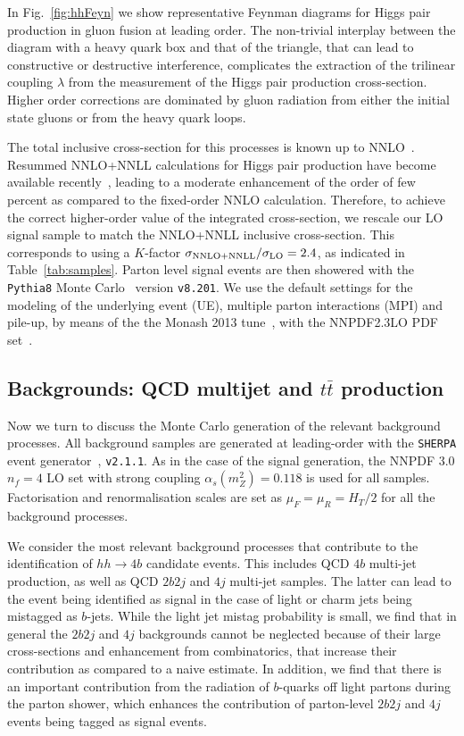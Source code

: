 In Fig.~\ref{fig:hhFeyn} we show representative Feynman diagrams
    for Higgs pair production in gluon fusion at
    leading order.
    The non-trivial interplay between the diagram with a heavy quark box
    and that of the triangle, that can lead to constructive or destructive interference,
    complicates the extraction of
    the trilinear coupling
    $\lambda$ from the measurement of the Higgs pair
    production cross-section.
    Higher order corrections are dominated by gluon radiation
    from either the initial state gluons or from the heavy quark loops.

    The total inclusive cross-section for this processes is
    known up to NNLO~\cite{deFlorian:2013jea}.
Resummed NNLO+NNLL calculations for Higgs pair production have become available recently~\cite{deFlorian:2015moa},
leading to a moderate enhancement of the order of
few percent as compared to the fixed-order NNLO calculation.
%
Therefore, to achieve the correct higher-order value of the  integrated cross-section, we rescale our LO signal sample to match the
NNLO+NNLL
inclusive cross-section.
%
This corresponds to using a $K$-factor $\sigma_{\rm NNLO+NNLL}/\sigma_{\rm LO}=2.4$, as indicated
in Table~\ref{tab:samples}.
%
Parton level signal events are then showered with the {\tt Pythia8} Monte
Carlo~\cite{Sjostrand:2007gs,Sjostrand:2014zea} version {\tt v8.201}.
%
We use the default settings for the modeling
of the underlying event (UE), multiple parton
interactions (MPI) and pile-up, by means
of the the Monash 2013 tune~\cite{Skands:2014pea},
with the NNPDF2.3LO PDF set~\cite{Ball:2012cx}.
%


\subsection{Backgrounds: QCD multijet and $t\bar{t}$ production}

Now we turn to discuss the Monte Carlo generation of the relevant background processes.
%
All background samples are generated at leading-order
with the {\tt SHERPA} event generator~\cite{Gleisberg:2008ta}, {\tt v2.1.1}.
%
As in the case of the signal generation,
the NNPDF 3.0 $n_f = 4$ LO set with strong coupling
$\alpha_s(m_Z^2)=0.118$ is used for all samples.
%
Factorisation and renormalisation scales are set as $\mu_F=\mu_R=H_T/2$ for all
the background processes.

We consider the most relevant background
processes that contribute to the identification of
 $hh\to 4b$ candidate events.
%
This includes  QCD $4b$ multi-jet production, as well as
QCD $2b2j$ and $4j$ multi-jet samples.
%
The latter can lead to the event being identified
as signal in the case of light or charm
jets being mistagged as $b$-jets.
%
While the light jet mistag probability is small, we find that
in general the $2b2j$ and $4j$ backgrounds cannot be neglected because
of their large cross-sections and enhancement from combinatorics, that
increase their contribution as compared to a naive estimate.
%
In addition, we find that there is an important contribution from the radiation
of $b$-quarks off light partons during the parton shower, which enhances the contribution
of parton-level $2b2j$ and $4j$ events being tagged as signal events.
%

